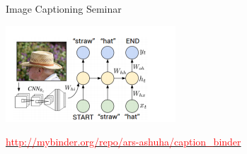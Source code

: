 \documentclass{beamer}
\begin{document}
\begin{frame}{Image Captioning Seminar}
	
	 \begin{center}
				  \includegraphics[scale=1.0]{img/ic3}
				
				  \href{http://mybinder.org/repo/ars-ashuha/caption_binder}{\textcolor{red}{http://mybinder.org/repo/ars-ashuha/caption\_binder}}
	\end{center}
\end{frame}
\end{document}
